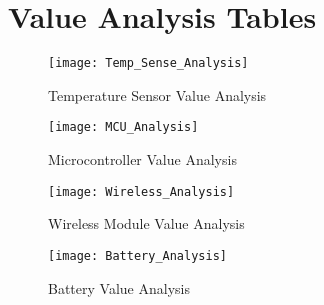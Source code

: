 \section{Value Analysis Tables}
\label{app:Tables}


\begin{figure}[H]
\centering
\texttt{[image: Temp\_Sense\_Analysis]}
\caption{Temperature Sensor Value Analysis}
\label{fig:Temp}
\end{figure}

\begin{figure}[H]
\centering
\texttt{[image: MCU\_Analysis]}
\caption{Microcontroller Value Analysis}
\label{fig:MCU}
\end{figure}

\begin{figure}[H]
\centering
\texttt{[image: Wireless\_Analysis]}
\caption{Wireless Module Value Analysis}
\label{fig:Wireless}
\end{figure}

\begin{figure}[H]
\centering
\texttt{[image: Battery\_Analysis]}
\caption{Battery Value Analysis}
\label{fig:Battery}
\end{figure}